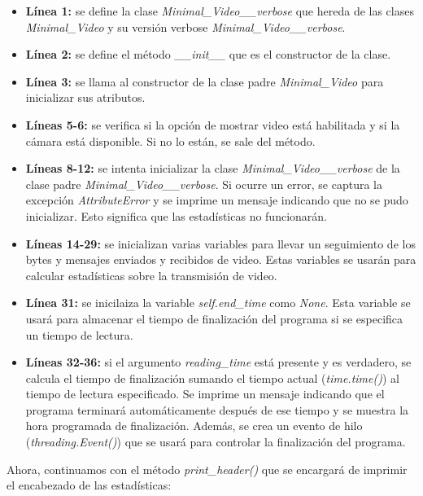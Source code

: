 \begin{itemize}
    \item \textbf{Línea 1:} se define la clase \textit{Minimal\_Video\_\_verbose} que hereda de las clases \textit{Minimal\_Video} y su versión verbose \textit{Minimal\_Video\_\_verbose}.
    \item \textbf{Línea 2:} se define el método \textit{\_\_init\_\_} que es el constructor de la clase.
    \item \textbf{Línea 3:} se llama al constructor de la clase padre \textit{Minimal\_Video} para inicializar sus atributos.
    \item \textbf{Líneas 5-6:} se verifica si la opción de mostrar video está habilitada y si la cámara está disponible. Si no lo están, se sale del método.
    \item \textbf{Líneas 8-12:} se intenta inicializar la clase \textit{Minimal\_Video\_\_verbose} de la clase padre \textit{Minimal\_Video\_\_verbose}. Si ocurre un error, se captura la excepción \textit{AttributeError} y se imprime un mensaje indicando que no se pudo inicializar. Esto significa que las estadísticas no funcionarán.
    \item \textbf{Líneas 14-29:} se inicializan varias variables para llevar un seguimiento de los bytes y mensajes enviados y recibidos de video. Estas variables se usarán para calcular estadísticas sobre la transmisión de video.
    \item \textbf{Línea 31:} se inicilaiza la variable \textit{self.end\_time} como \textit{None}. Esta variable se usará para almacenar el tiempo de finalización del programa si se especifica un tiempo de lectura.
    \item \textbf{Líneas 32-36:} si el argumento \textit{reading\_time} está presente y es verdadero, se calcula el tiempo de finalización sumando el tiempo actual (\textit{time.time()}) al tiempo de lectura especificado. Se imprime un mensaje indicando que el programa terminará automáticamente después de ese tiempo y se muestra la hora programada de finalización. Además, se crea un evento de hilo (\textit{threading.Event()}) que se usará para controlar la finalización del programa.
\end{itemize}

Ahora, continuamos con el método \textit{print\_header()} que se encargará de imprimir el encabezado de las estadísticas:

